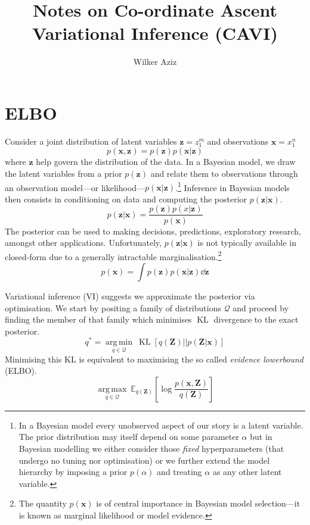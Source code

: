 \documentclass[11pt]{article}
\title{Notes on Co-ordinate Ascent Variational Inference (CAVI)}
\author{Wilker Aziz}
\DeclareMathOperator*{\argmin}{arg\,min}
\DeclareMathOperator*{\argmax}{arg\,max}
\DeclareMathOperator{\KL}{KL}
\newcommand{\x}{\ensuremath{\mathbf x}}
\newcommand{\z}{\ensuremath{\mathbf z}}
\newcommand{\Z}{\ensuremath{\mathbf Z}}
\begin{document}
\maketitle

\section{ELBO}

Consider a joint distribution of latent variables $\z = z_1^m$ and observations $\x=x_1^n$
\begin{equation}
p(\x, \z) = p(\z)p(\x|\z)
\end{equation}
 where $\z$ help govern the distribution of the data. 
 In a Bayesian model, we draw the latent variables from a prior $p(\z)$ and relate them to observations through an observation model---or likelihood---$p(\x|\z)$.\footnote{
In a Bayesian model every unobserved aspect of our story is a latent variable. The prior distribution may itself depend on some parameter $\alpha$ but in Bayesian modelling we either consider those \emph{fixed} hyperparameters (that undergo no tuning nor optimisation) or we further extend the model hierarchy by imposing a prior $p(\alpha)$ and treating $\alpha$ as any other latent variable.}
Inference in Bayesian models then consists in conditioning on data and computing the posterior $p(\z|\x)$.
 \begin{equation}\label{eq:posterior}
 	p(\z|\x) = \frac{p(\z)p(x|\z)}{p(\x)}
 \end{equation}
The posterior can be used to making decisions, predictions, exploratory research, amongst other applications. 
Unfortunately, $p(\z|\x)$ is not typically available in closed-form due to a generally intractable marginalisation.\footnote{The quantity $p(\x)$ is of central importance in Bayesian model selection---it is known as marginal likelihood or model evidence.}
\begin{equation}
p(\x) = \int p(\z)p(\x|\z) \dd \z
\end{equation}


 
Variational inference (VI) \citep{JordanEtAl1999VI,BleiEtAl2017VI} suggests we approximate the posterior via optimisation. 
 We start by positing a family of distributions $\mathcal Q$ and proceed by finding the member of that family which minimises $\KL$ divergence to the exact posterior. 
 \begin{equation}\label{eq:objective}
 	q^* = \underset{q \in \mathcal Q}{\argmin} ~ \KL\left[q(\Z) || p(\Z|\x) \right]
 \end{equation}
Minimising this KL is equivalent to maximising the so called \emph{evidence lowerbound} (ELBO).
\begin{equation}\label{eq:ELBO}
	\underset{q\in \mathcal Q}{\argmax} ~ \mathbb E_{q(\Z)}\left[ \log \frac{p(\x, \Z)}{q(\Z)} \right]
\end{equation}
\end{document}

